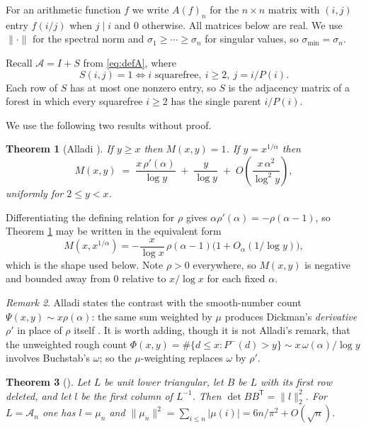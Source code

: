 \documentclass[11pt]{article}
\newtheorem{theorem}{Theorem}
\theoremstyle{definition}
\theoremstyle{remark}
\newtheorem{remark}[theorem]{Remark}
\newcommand{\Ac}{\mathcal{A}}
\newcommand{\Pp}{P}
\newcommand{\Pm}{P^{-}}
\begin{document}
For an arithmetic function $f$ we write $A(f)_n$ for the $n\times n$ matrix with
$(i,j)$ entry $f(i/j)$ when $j\mid i$ and $0$ otherwise. All matrices below are
real. We use $\|\cdot\|$ for the spectral norm and $\sigma_1\ge\cdots\ge\sigma_n$
for singular values, so $\sigma_{\min}=\sigma_n$.

Recall $\Ac=I+S$ from \eqref{eq:defA}, where
\begin{equation}\label{eq:defS}
  S(i,j)=1 \iff i \text{ squarefree},\ i\ge2,\ j=i/\Pp(i).
\end{equation}
Each row of $S$ has at most one nonzero entry, so $S$ is the adjacency matrix of a
forest in which every squarefree $i\ge2$ has the single parent $i/\Pp(i)$.

We use the following two results without proof.

\begin{theorem}[Alladi {\cite[Thm.~1]{alladiJNT}}]\label{thm:alladi}
If $y\ge x$ then $M(x,y)=1$. If $y=x^{1/\alpha}$ then
\[
  M(x,y) \;=\; \frac{x\,\rho'(\alpha)}{\log y} \;+\;\frac{y}{\log y}
  \;+\;O\!\left(\frac{x\,\alpha^2}{\log^2 y}\right),
\]
uniformly for $2\le y<x$.
\end{theorem}

Differentiating the defining relation for $\rho$ gives $\alpha\rho'(\alpha) =
-\rho(\alpha-1)$, so Theorem \ref{thm:alladi} may be written in the equivalent form
\begin{equation}\label{eq:alladi2}
  M(x,x^{1/\alpha}) = -\frac{x}{\log x}\,\rho(\alpha-1)\bigl(1+O_\alpha(1/\log y)\bigr),
\end{equation}
which is the shape used below. Note $\rho>0$ everywhere, so $M(x,y)$ is negative
and bounded away from $0$ relative to $x/\log x$ for each fixed $\alpha$.

\begin{remark}\label{rem:buchstab}
Alladi states the contrast with the smooth-number count
$\Psi(x,y)\sim x\rho(\alpha)$: the same sum weighted by $\mu$ produces Dickman's
\emph{derivative} $\rho'$ in place of $\rho$ itself \cite[p.~87]{alladiJNT}. It is
worth adding, though it is not Alladi's remark, that the unweighted rough count
$\Phi(x,y)=\#\{d\le x:\Pm(d)>y\}\sim x\,\omega(\alpha)/\log y$ involves Buchstab's
$\omega$; so the $\mu$-weighting replaces $\omega$ by $\rho'$.
\end{remark}

\begin{theorem}[{\cite[Thms.~1 and 3]{kline588}}]\label{thm:588}
Let $L$ be unit lower triangular, let $B$ be $L$ with its first row deleted, and
let $l$ be the first column of $L^{-1}$. Then $\det BB^{\mathsf T}=\|l\|_2^2$. For
$L=\Ac_n$ one has $l=\mu_n$ and
$\|\mu_n\|^2=\sum_{i\le n}|\mu(i)|=6n/\pi^2+O(\sqrt n)$.
\end{theorem}
\end{document}
